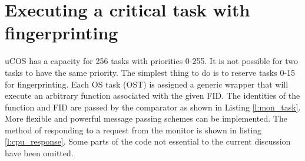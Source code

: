\section{Executing a critical task with fingerprinting}
uCOS has a capacity for 256 tasks with priorities 0-255. It is not possible for two tasks to have the same priority. The simplest thing to do is to reserve tasks 0-15 for fingerprinting. Each OS task (OST) is assigned a generic wrapper that will execute an arbitrary function associated with the given FID. The identities of the function and FID are passed by the comparator as shown in Listing \ref{l:mon_task}. More flexible and powerful message passing schemes can be implemented. The method of responding to a request from the monitor is shown in listing \ref{l:cpu_response}. Some parts of the code not essential to the current discussion have been omitted.
